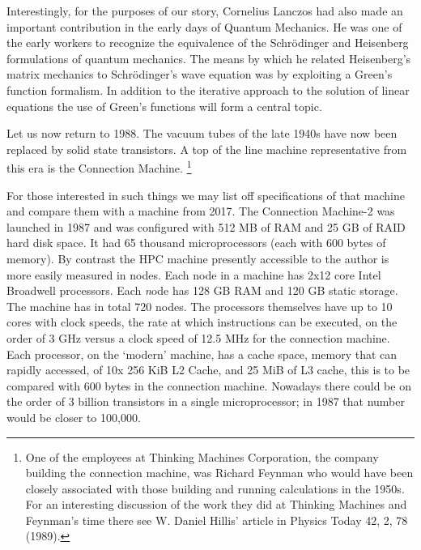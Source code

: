Interestingly, for the purposes of our story, 
Cornelius Lanczos had also made an important contribution in the early
days of Quantum Mechanics. He was one of the early workers
to recognize the equivalence of the Schr\"odinger and Heisenberg
formulations of quantum mechanics\cite{lanczos26}. %
The means by which he related Heisenberg's matrix mechanics to
Schr\"odinger's wave equation was by exploiting a Green's function formalism. In addition
to the iterative approach to the solution of linear equations the use of Green's functions
will form a central topic.

Let us now return to 1988. The vacuum tubes of the late 1940s have
now been replaced by solid state transistors. A top of the line machine 
representative from this era is the Connection Machine.
\footnote{One of the employees at Thinking Machines Corporation,
the company building the connection machine, was Richard Feynman
who would have been closely associated with those building and running
calculations in the 1950s. For an interesting discussion of the work they
did at Thinking Machines and Feynman's time there see W. Daniel
Hillis' article in Physics Today 42, 2, 78 (1989).}

For those interested in such things we may list off specifications of 
that machine and compare them with a machine from 2017. The 
Connection Machine-2 was launched in 1987 and was configured with 512 MB of RAM and 25 GB of RAID
hard disk space. 
It had 65 thousand microprocessors (each with 600 bytes of memory). 
By contrast the HPC machine presently accessible to the author 
is more easily measured in nodes. Each node in a machine has 2x12 core Intel Broadwell processors.
Each {\emph node} has 128 GB RAM and 120 GB static storage. The machine has in total 720 nodes. 
The processors themselves have up to 10 cores with clock speeds, the rate at which 
instructions can be executed, on the order of 3 GHz versus 
a clock speed of 12.5 MHz for the connection machine. 
Each processor, on the `modern' machine, has a cache 
space, memory that can rapidly accessed, of 10x 256 KiB L2 Cache, and 25 MiB of L3 cache,
this is to be compared with 600 bytes in the connection machine. 
Nowadays there could be on the order of 3 billion transistors in a 
single microprocessor; in 1987 that number would be closer to 100,000. 

